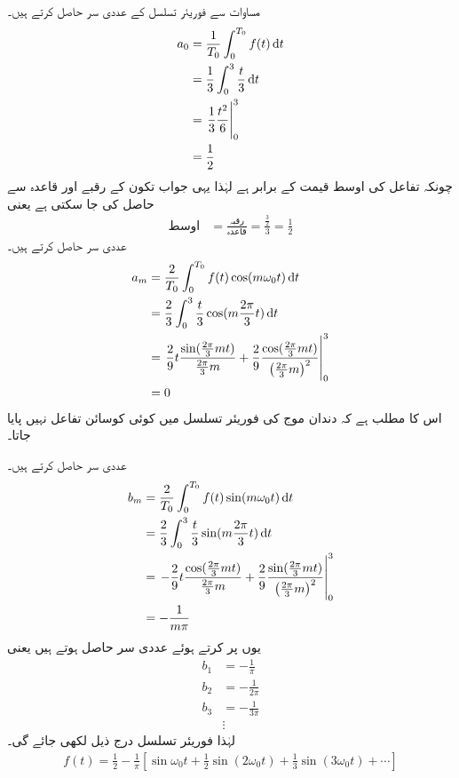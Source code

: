 مساوات  سے فوریئر تسلسل کے عددی سر حاصل کرتے ہیں۔
\begin{align*}
a_0&=\frac{1}{T_0}\int_0^{T_0} f(t) \dif t\\
&=\frac{1}{3}\int_0^3 \frac{t}{3} \dif t\\
&=\left. \frac{1}{3} \frac{t^2}{6} \right|_0^3\\
&=\frac{1}{2}
\end{align*}
چونکہ  تفاعل کی اوسط قیمت کے برابر ہے لہٰذا یہی جواب تکون کے رقبے  اور قاعدہ  سے حاصل کی جا سکتی ہے یعنی
\begin{align*}
\text{اوسط}&=\frac{\text{رقبہ}}{\text{قاعدہ}}=\frac{\frac{3}{2}}{3}=\frac{1}{2}
\end{align*}
عددی سر  حاصل کرتے ہیں۔
\begin{align*}
a_m&=\frac{2}{T_0}\int_0^{T_0} f(t)\cos (m\omega_0 t) \dif t\\
&=\frac{2}{3}\int_0^3 \frac{t}{3} \cos (m \frac{2\pi}{3} t) \dif t\\
&=\left. \frac{2}{9}t \frac{\sin(\frac{2\pi}{3}mt)}{\frac{2\pi}{3}m}+\frac{2}{9}\frac{\cos(\frac{2\pi}{3}mt)}{\left(\frac{2\pi}{3}m\right)^2}\right|_0^3\\
&=0
\end{align*}
اس کا مطلب ہے کہ دندان موج کی فوریئر تسلسل میں کوئی کوسائن تفاعل نہیں پایا جاتا۔

عددی سر  حاصل کرتے ہیں۔
\begin{align*}
b_m&=\frac{2}{T_0}\int_0^{T_0} f(t)\sin(m\omega_0 t) \dif t\\
&=\frac{2}{3}\int_0^3 \frac{t}{3}\sin (m\frac{2\pi}{3} t) \dif t\\
&=\left.-\frac{2}{9}t\frac{\cos(\frac{2\pi}{3}mt)}{\frac{2\pi}{3}m}+\frac{2}{9}\frac{\sin(\frac{2\pi}{3}mt)}{\left(\frac{2\pi}{3}m\right)^2}\right|_0^3\\
&=-\frac{1}{m\pi}
\end{align*}
یوں  پر کرتے ہوئے عددی سر حاصل ہوتے ہیں یعنی
\begin{align*}
b_1&=-\frac{1}{\pi}\\
b_2&=-\frac{1}{2\pi}\\
b_3&=-\frac{1}{3\pi}\\
&\vdots
\end{align*}
لہٰذا فوریئر تسلسل درج ذیل لکھی جائے گی۔
\begin{align}
f(t)=\frac{1}{2}-\frac{1}{\pi}\left[\sin \omega_0 t+\frac{1}{2} \sin (2\omega_0 t) +\frac{1}{3} \sin (3\omega_0 t)+\cdots\right]
\end{align}

